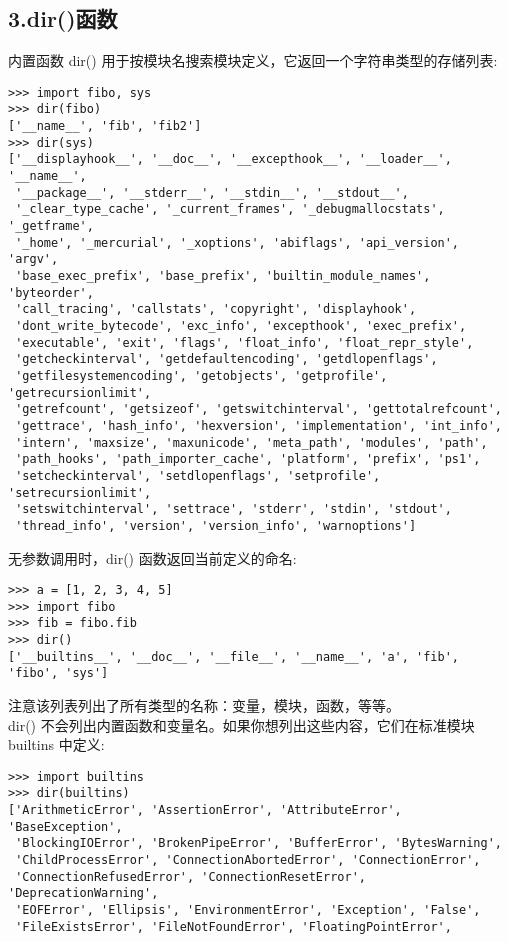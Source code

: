 \documentclass{article}
\begin{document}
\begin{CJK}{UTF8}{gbsn}
\section*{3.dir()函数}
内置函数 dir() 用于按模块名搜索模块定义，它返回一个字符串类型的存储列表:
\begin{verbatim}
>>> import fibo, sys
>>> dir(fibo)
['__name__', 'fib', 'fib2']
>>> dir(sys)  
['__displayhook__', '__doc__', '__excepthook__', '__loader__', '__name__',
 '__package__', '__stderr__', '__stdin__', '__stdout__',
 '_clear_type_cache', '_current_frames', '_debugmallocstats', '_getframe',
 '_home', '_mercurial', '_xoptions', 'abiflags', 'api_version', 'argv',
 'base_exec_prefix', 'base_prefix', 'builtin_module_names', 'byteorder',
 'call_tracing', 'callstats', 'copyright', 'displayhook',
 'dont_write_bytecode', 'exc_info', 'excepthook', 'exec_prefix',
 'executable', 'exit', 'flags', 'float_info', 'float_repr_style',
 'getcheckinterval', 'getdefaultencoding', 'getdlopenflags',
 'getfilesystemencoding', 'getobjects', 'getprofile', 'getrecursionlimit',
 'getrefcount', 'getsizeof', 'getswitchinterval', 'gettotalrefcount',
 'gettrace', 'hash_info', 'hexversion', 'implementation', 'int_info',
 'intern', 'maxsize', 'maxunicode', 'meta_path', 'modules', 'path',
 'path_hooks', 'path_importer_cache', 'platform', 'prefix', 'ps1',
 'setcheckinterval', 'setdlopenflags', 'setprofile', 'setrecursionlimit',
 'setswitchinterval', 'settrace', 'stderr', 'stdin', 'stdout',
 'thread_info', 'version', 'version_info', 'warnoptions']
\end{verbatim}
无参数调用时，dir() 函数返回当前定义的命名:
\begin{verbatim}
>>> a = [1, 2, 3, 4, 5]
>>> import fibo
>>> fib = fibo.fib
>>> dir()
['__builtins__', '__doc__', '__file__', '__name__', 'a', 'fib', 'fibo', 'sys']
\end{verbatim}
注意该列表列出了所有类型的名称：变量，模块，函数，等等。\\
dir() 不会列出内置函数和变量名。如果你想列出这些内容，它们在标准模块 builtins 中定义:
\begin{verbatim}
>>> import builtins
>>> dir(builtins)  
['ArithmeticError', 'AssertionError', 'AttributeError', 'BaseException',
 'BlockingIOError', 'BrokenPipeError', 'BufferError', 'BytesWarning',
 'ChildProcessError', 'ConnectionAbortedError', 'ConnectionError',
 'ConnectionRefusedError', 'ConnectionResetError', 'DeprecationWarning',
 'EOFError', 'Ellipsis', 'EnvironmentError', 'Exception', 'False',
 'FileExistsError', 'FileNotFoundError', 'FloatingPointError',

\end{verbatim}
\end{CJK}
\end{document}
